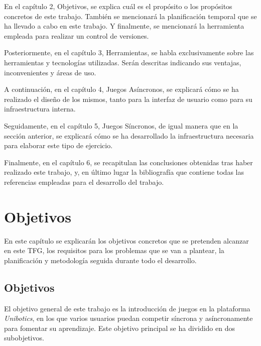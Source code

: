 \documentclass[a4paper, 12pt]{book}
\begin{document}
En el capítulo 2, Objetivos, se explica cuál es el propósito o los propósitos concretos de este trabajo. También se mencionará la planificación temporal que se ha llevado a cabo en este trabajo. Y finalmente, se mencionará la herramienta empleada para realizar un control de versiones.

Posteriormente, en el capítulo 3, Herramientas, se habla exclusivamente sobre las herramientas y tecnologías utilizadas. Serán descritas indicando sus ventajas, inconvenientes y áreas de uso.

A continuación, en el capítulo 4, Juegos Asíncronos, se explicará cómo se ha realizado el diseño de los mismos, tanto para la interfaz de usuario como para su infraestructura interna.

Seguidamente, en el capítulo 5, Juegos Síncronos, de igual manera que en la sección anterior, se explicará cómo se ha desarrollado la infraestructura necesaria para elaborar este tipo de ejercicio.

Finalmente, en el capítulo 6, se recapitulan las conclusiones obtenidas tras haber realizado este trabajo, y, en último lugar la bibliografía que contiene todas las referencias empleadas para el desarrollo del trabajo.


\cleardoublepage %
\chapter{Objetivos} %
\label{chap:objetivos} %

En este capítulo se explicarán los objetivos concretos que se pretenden alcanzar en este TFG, los requisitos para los problemas que se van a plantear, la planificación y metodología seguida durante todo el desarrollo.

\section{Objetivos} %
\label{sec:objetivo-general} %

El objetivo general de este trabajo es la introducción de juegos en la plataforma \emph{Unibotics}, en los que varios usuarios puedan competir síncrona y asíncronamente para fomentar su aprendizaje. Este objetivo principal se ha dividido en dos subobjetivos.
\end{document}

